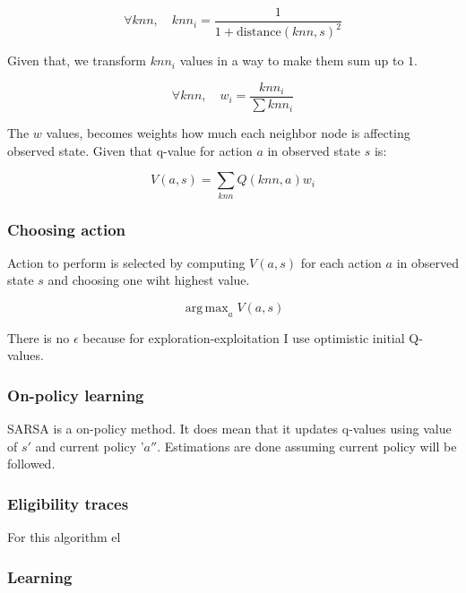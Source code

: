 \documentclass[12pt]{article}
\DeclareMathOperator*{\argmax}{arg\,max}
\begin{document}
\begin{equation}
\forall knn, \quad knn_i = \frac{1}{1+\text{distance}(knn, s)^2}
\end{equation}

Given that, we transform $knn_i$ values in a way to make them sum up to $1$.

\begin{equation}
\forall knn, \quad w_i = \frac{knn_i}{\sum knn_i}
\end{equation}

The $w$ values, becomes weights how much each neighbor node is affecting observed state. Given that q-value for action $a$ in observed state $s$ is:

\begin{equation}
V(a, s) = \sum_{knn} Q(knn, a)w_i
\end{equation}

\subsubsection{Choosing action}

Action to perform is selected by computing $V(a, s)$ for each action $a$ in observed state $s$ and choosing one wiht highest value.

\begin{equation}
\argmax_a V(a, s)
\end{equation}

There is no $\epsilon$ because for exploration-exploitation I use optimistic initial Q-values.

\subsubsection{On-policy learning}

SARSA is a on-policy method. It does mean that it updates q-values using value of $s'$ and current policy '$a''$. Estimations are done assuming current policy will be followed.

\subsubsection{Eligibility traces}

For this algorithm el

\subsubsection{Learning}
\end{document}

